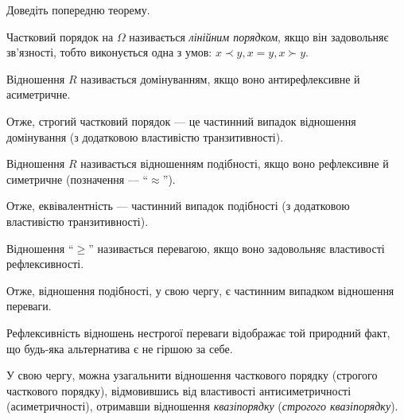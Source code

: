 \begin{sproblem}
	Доведіть попередню теорему.
\end{sproblem}

\begin{definition}
	Частковий порядок на $\Omega$ називається \textit{лінійним порядком}, якщо він задовольняє зв'язності, тобто виконується одна з умов: $x \prec y, x = y, x \succ y$.
\end{definition}

\begin{definition}
	Відношення $R$ називається домінуванням, якщо воно антирефлексивне й асиметричне. 
\end{definition}

\begin{remark}
	Отже, строгий частковий порядок --- це частинний випадок відношення домінування (з додатковою властивістю транзитивності).
\end{remark}

\begin{definition}
	Відношення $R$ називається відношенням подібності, якщо воно рефлексивне й симетричне (позначення --- ``$\approx$'').
\end{definition}

\begin{remark}
	Отже, еквівалентність --- частинний випадок подібності (з додатковою властивістю транзитивності).
\end{remark}

\begin{definition}
	Відношення ``$\ge$'' називається перевагою, якщо воно задовольняє властивості рефлексивності.
\end{definition}

\begin{remark}
	Отже, відношення подібності, у свою чергу, є частинним випадком відношення переваги. 
\end{remark}

Рефлексивність відношень нестрогої переваги відображає той природний факт, що будь-яка альтернатива є не гіршою за себе. \medskip

У свою чергу, можна узагальнити відношення часткового порядку (строгого часткового порядку), відмовившись від властивості антисиметричності (асиметричності), отримавши відношення \textit{квазіпорядку} (\textit{строгого квазіпорядку}). \medskip

